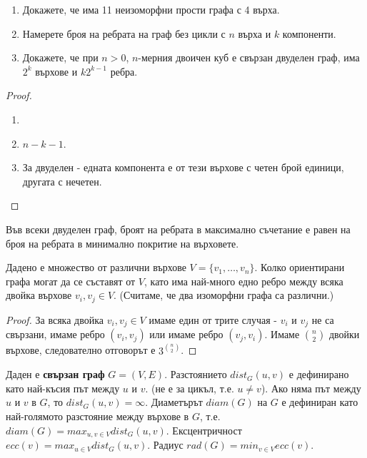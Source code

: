 \begin{problem}
  \begin{enumerate}
  \item
    Докажете, че има 11 неизоморфни прости графа с 4 върха.
  \item
    Намерете броя на ребрата на граф без цикли с $n$ върха и $k$ компоненти.
  \item
    Докажете, че при $n>0$, $n$-мерния двоичен куб е свързан двуделен граф, има $2^k$ върхове и $k2^{k-1}$ ребра.
\end{enumerate}

\end{problem}
\begin{proof}
  \begin{enumerate}
  \item
    
  \item
    $n-k-1$.
  \item
    За двуделен - едната компонента е от тези върхове с четен брой единици, другата с нечетен.
\end{enumerate}

\end{proof}


\begin{thm}
  Във всеки двуделен граф, броят на ребрата в максимално съчетание е равен на броя на ребрата в минимално покритие на върховете. 
\end{thm}



\begin{problem}
  Дадено е множество от различни върхове $V=\{v_1,\dots,v_n\}$.
  Колко ориентирани графа могат да се съставят от $V$, като има най-много едно ребро между всяка двойка върхове $v_i,v_j\in V$.
  (Считаме, че два изоморфни графа са различни.)
\end{problem}
\begin{proof}
  За всяка двойка $v_i,v_j\in V$ имаме един от трите случая - $v_i$ и $v_j$ не са свързани, 
  имаме ребро $(v_i,v_j)$ или имаме ребро $(v_j,v_i)$.
  Имаме $\binom{n}{2}$ двойки върхове, следователно отговорът е $3^{\binom{n}{2}}$.
\end{proof}

\begin{dfn}
  Даден е {\bf свързан граф} $G=(V,E)$.
  Разстоянието $dist_G(u,v)$ е дефинирано като най-късия път между $u$ и $v$. (не е за цикъл, т.е. $u\neq v$).
  Ако няма път между $u$ и $v$ в $G$, то $dist_G(u,v) = \infty$.
  Диаметърът $diam(G)$ на $G$ е дефиниран като най-голямото разстояние между върхове в $G$, т.е.
  $diam(G) = max_{u,v\in V}dist_G(u,v)$.
  Ексцентричност $ecc(v) = max_{u\in V}dist_G(u,v)$.
  Радиус $rad(G) = min_{v\in V}ecc(v)$.
\end{dfn}


